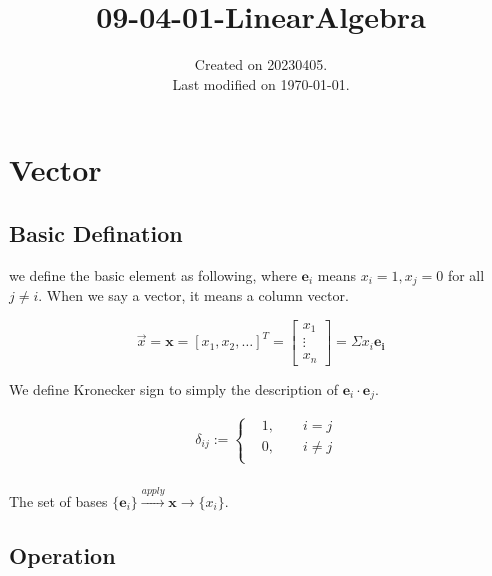 \documentclass[UTF8]{../../09-Mathematics}
\begin{document}
\title{09-04-01-LinearAlgebra}
\date{Created on 20230405.\\   Last modified on \today.}
\maketitle
\tableofcontents




\chapter{Vector}


\section{Basic Defination}

we define the basic element as following, where $ \boldsymbol e_i $ means $x_i = 1, x_j = 0$ for all $j \neq i$. When we say a vector, it means a column vector.

\begin{equation}
\vec{x}  = \boldsymbol x = [x_1, x_2,\dots]^T
= \begin{bmatrix}
    x_1 \\
    \vdots \\
    x_n
\end{bmatrix}
= \Sigma x_i \boldsymbol{e_i} 
\end{equation}

We define Kronecker sign to simply the description of $\boldsymbol e_i \cdot \boldsymbol e_j $.

\begin{equation}
    \begin{split}
    &\delta _{ij}:=
    \begin{cases}
    &1,\qquad i = j\\
    &0,\qquad i \neq j\\
    \end{cases}\\
    \end{split}
\end{equation}

The set of bases $\{ \boldsymbol e_i  \}  \xrightarrow{apply} \boldsymbol{x} \longrightarrow    \{ x_i \}   $.





\section{Operation}
\end{document}
